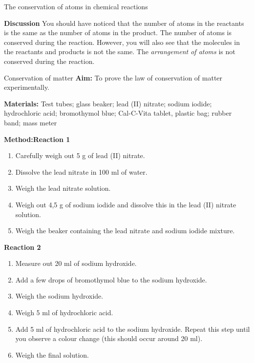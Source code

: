 \begin{activity}{The conservation of atoms in chemical reactions }
\begin{minipage}{.4\textwidth}
\begin{center}
\end{center}
\end{minipage}
        \par 
      \label{m38711*id65031}\noindent{}\textbf{Discussion}
     You should have noticed that the number of atoms in the reactants is the same as the number of atoms in the product. The number of atoms is conserved during the reaction. However, you will also see that the molecules in the reactants and products is not the same. The \textsl{arrangement of atoms} is not conserved during the reaction.
 \par 
\end{activity}
\label{m38711*eip-14}
            \begin{g_experiment}{Conservation of matter}
            \nopagebreak
            \label{m38711*eip-453}\noindent{}\textbf{Aim:}
To prove the law of conservation of matter experimentally.
\par 
\label{m38711*eip792}\noindent{}\textbf{Materials:}
Test tubes; glass beaker; lead (II) nitrate; sodium iodide; hydrochloric acid; bromothymol blue; Cal-C-Vita tablet, plastic bag; rubber band; mass meter 
\par 
\label{m38711*eip-153}
	\par
      \label{m38711*id72432}\noindent{}\textbf{Method:}\textbf{Reaction 1}
\label{m38711*id6342}\begin{enumerate}[noitemsep, label=\textbf{\arabic*}. ] 
            \item Carefully weigh out 5 g of lead (II) nitrate.\item Dissolve the lead nitrate in 100 ml of water. \item Weigh the lead nitrate solution.\item Weigh out 4,5 g of sodium iodide and dissolve this in the lead (II) nitrate solution.\item Weigh the beaker containing the lead nitrate and sodium iodide mixture.\end{enumerate}
\textbf{Reaction 2}
\label{m38711*id63452}\begin{enumerate}[noitemsep, label=\textbf{\arabic*}. ] 
            \item Measure out 20 ml of sodium hydroxide.\item Add a few drops of bromothymol blue to the sodium hydroxide.\item Weigh the sodium hydroxide.\item Weigh 5 ml of hydrochloric acid.\item Add 5 ml of hydrochloric acid to the sodium hydroxide. Repeat this step until you observe a colour change (this should occur around 20 ml).\item Weigh the final solution.\end{enumerate}

\end{g_experiment}
